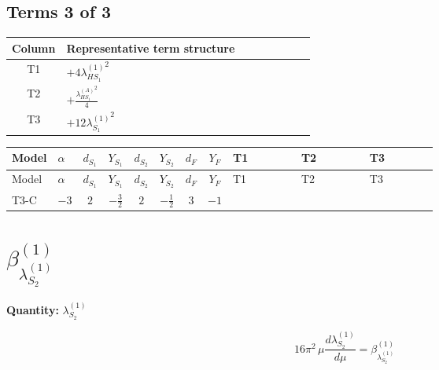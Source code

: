 \documentclass[8pt]{article}
\begin{document}
\begin{landscape}
\subsection*{Terms 3 of 3}
\begin{center}
\begin{tabular}{@{}c >{\raggedright\arraybackslash}p{0.82\linewidth}@{}}
\toprule
Column & Representative term structure \\
\midrule
T1 & \(\displaystyle +4 {\lambda_{HS_1}^{(1)}}^2\) \\
\midrule
T2 & \(\displaystyle +\frac{{\lambda_{HS_1}^{(A)}}^2}{4}\) \\
\midrule
T3 & \(\displaystyle +12 {\lambda_{S_1}^{(1)}}^2\) \\
\midrule
\bottomrule
\end{tabular}
\end{center}
\smallskip
\tiny
\begin{longtable}{@{}llcccccc >{\raggedright\arraybackslash}p{0.21\linewidth} >{\raggedright\arraybackslash}p{0.21\linewidth} >{\raggedright\arraybackslash}p{0.21\linewidth}@{}}
\toprule
Model & $\alpha$ & $d_{S_1}$ & $Y_{S_1}$ & $d_{S_2}$ & $Y_{S_2}$ & $d_F$ & $Y_F$ & T1 & T2 & T3 \\
\midrule
\endfirsthead
\toprule
Model & $\alpha$ & $d_{S_1}$ & $Y_{S_1}$ & $d_{S_2}$ & $Y_{S_2}$ & $d_F$ & $Y_F$ & T1 & T2 & T3 \\
\midrule
\endhead
T3-C & $-3$ & $2$ & $-\frac{3}{2}$ & $2$ & $-\frac{1}{2}$ & $3$ & $-1$ & \scriptsize\adjustbox{max width=\linewidth}{$\begin{gathered} +4 {\lambda_{HS_1}^{(1)}}^2\end{gathered}$} & \scriptsize\adjustbox{max width=\linewidth}{$\begin{gathered} +\frac{{\lambda_{HS_1}^{(A)}}^2}{4}\end{gathered}$} & \scriptsize\adjustbox{max width=\linewidth}{$\begin{gathered} +12 {\lambda_{S_1}^{(1)}}^2\end{gathered}$} \\
\midrule
\bottomrule
\end{longtable}
\clearpage
\section*{$\beta_{\lambda_{S_2}^{(1)}}^{(1)}$}
\noindent\textbf{Quantity: }$\lambda_{S_2}^{(1)}$\par\smallskip
\[16\pi^2\,\mu\frac{d \lambda_{S_2}^{(1)}}{d\mu}=\beta_{\lambda_{S_2}^{(1)}}^{(1)}\]

\end{landscape}
\end{document}
